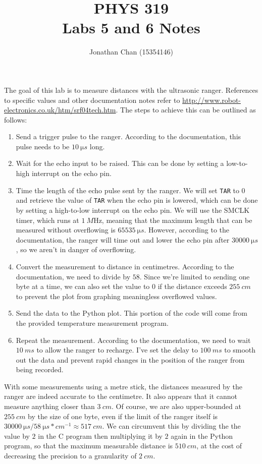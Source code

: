 \documentclass[letterpaper]{article}
\author{Jonathan Chan (15354146)}
\title{PHYS 319\\Labs 5 and 6 Notes}
\begin{document}
	\maketitle
	
	The goal of this lab is to measure distances with the ultrasonic ranger. References to specific values and other documentation notes refer to \url{http://www.robot-electronics.co.uk/htm/srf04tech.htm}. The steps to achieve this can be outlined as follows:
		\begin{enumerate}
			\item Send a trigger pulse to the ranger. According to the documentation, this pulse needs to be $\SI{10}{\micro s}$ long.
			\item Wait for the echo input to be raised. This can be done by setting a low-to-high interrupt on the echo pin.
			\item Time the length of the echo pulse sent by the ranger. We will set \texttt{TAR} to 0 and retrieve the value of \texttt{TAR} when the echo pin is lowered, which can be done by setting a high-to-low interrupt on the echo pin. We will use the SMCLK timer, which runs at $\SI{1}{M\hertz}$, meaning that the maximum length that can be measured without overflowing is $\SI{65 535}{\micro s}$. However, according to the documentation, the ranger will time out and lower the echo pin after $\SI{30 000}{\micro s}$, so we aren't in danger of overflowing. 
			\item Convert the measurement to distance in centimetres. According to the documentation, we need to divide by $58$. Since we're limited to sending one byte at a time, we can also set the value to $0$ if the distance exceeds $\SI{255}{cm}$ to prevent the plot from graphing meaningless overflowed values.
			\item Send the data to the Python plot. This portion of the code will come from the provided temperature measurement program.
			\item Repeat the measurement. According to the documentation, we need to wait $\SI{10}{ms}$ to allow the ranger to recharge. I've set the delay to $\SI{100}{ms}$ to smooth out the data and prevent rapid changes in the position of the ranger from being recorded.
		\end{enumerate}
	With some measurements using a metre stick, the distances measured by the ranger are indeed accurate to the centimetre. It also appears that it cannot measure anything closer than $\SI{3}{cm}$. Of course, we are also upper-bounded at $\SI{255}{cm}$ by the size of one byte, even if the limit of the ranger itself is $\SI{30 000}{\micro s} / \SI{58}{\micro s*cm^{-1}} \approx \SI{517}{cm}$. We can circumvent this by dividing the the value by $2$ in the C program then multiplying it by $2$ again in the Python program, so that the maximum measurable distance is $\SI{510}{cm}$, at the cost of decreasing the precision to a granularity of $\SI{2}{cm}$.
	
\end{document}
